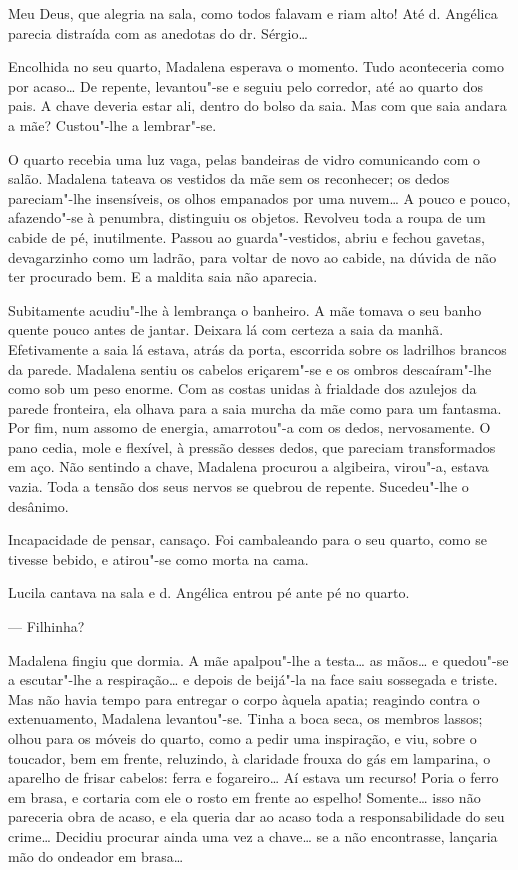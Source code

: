 Meu Deus, que alegria na sala, como todos falavam e riam alto! Até d.
Angélica parecia distraída com as anedotas do dr. Sérgio\ldots{}

Encolhida no seu quarto, Madalena esperava o momento. Tudo aconteceria
como por acaso\ldots{} De repente, levantou"-se e seguiu pelo corredor, até ao
quarto dos pais. A chave deveria estar ali, dentro do bolso da saia. Mas
com que saia andara a mãe? Custou"-lhe a lembrar"-se.

O quarto recebia uma luz vaga, pelas bandeiras de vidro comunicando com
o salão. Madalena tateava os vestidos da mãe sem os reconhecer; os dedos
pareciam"-lhe insensíveis, os olhos empanados por uma nuvem\ldots{} A pouco e
pouco, afazendo"-se à penumbra, distinguiu os objetos. Revolveu toda a
roupa de um cabide de pé, inutilmente. Passou ao guarda"-vestidos, abriu
e fechou gavetas, devagarzinho como um ladrão, para voltar de novo ao
cabide, na dúvida de não ter procurado bem. E a maldita saia não
aparecia.

Subitamente acudiu"-lhe à lembrança o banheiro. A mãe tomava o seu banho
quente pouco antes de jantar. Deixara lá com certeza a saia da manhã.
Efetivamente a saia lá estava, atrás da porta, escorrida sobre os
ladrilhos brancos da parede. Madalena sentiu os cabelos eriçarem"-se e os
ombros descaíram"-lhe como sob um peso enorme. Com as costas unidas à
frialdade dos azulejos da parede fronteira, ela olhava para a saia
murcha da mãe como para um fantasma. Por fim, num assomo de energia,
amarrotou"-a com os dedos, nervosamente. O pano cedia, mole e flexível, à
pressão desses dedos, que pareciam transformados em aço. Não sentindo a
chave, Madalena procurou a algibeira, virou"-a, estava vazia. Toda a
tensão dos seus nervos se quebrou de repente. Sucedeu"-lhe o desânimo.

Incapacidade de pensar, cansaço. Foi cambaleando para o seu quarto, como
se tivesse bebido, e atirou"-se como morta na cama.

Lucila cantava na sala e d. Angélica entrou pé ante pé no quarto.

--- Filhinha?

Madalena fingiu que dormia. A mãe apalpou"-lhe a testa\ldots{} as mãos\ldots{} e
quedou"-se a escutar"-lhe a respiração\ldots{} e depois de beijá"-la na face
saiu sossegada e triste. Mas não havia tempo para entregar o corpo
àquela apatia; reagindo contra o extenuamento, Madalena levantou"-se.
Tinha a boca seca, os membros lassos; olhou para os móveis do quarto,
como a pedir uma inspiração, e viu, sobre o toucador, bem em frente,
reluzindo, à claridade frouxa do gás em lamparina, o aparelho de frisar
cabelos: ferra e fogareiro\ldots{} Aí estava um recurso! Poria o ferro em
brasa, e cortaria com ele o rosto em frente ao espelho! Somente\ldots{} isso
não pareceria obra de acaso, e ela queria dar ao acaso toda a
responsabilidade do seu crime\ldots{} Decidiu procurar ainda uma vez a
chave\ldots{} se a não encontrasse, lançaria mão do ondeador em brasa\ldots{}

